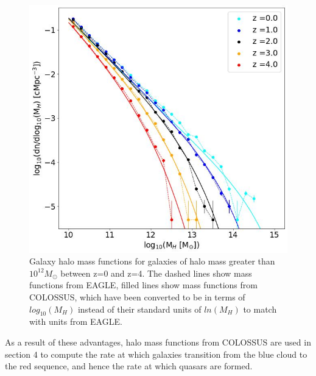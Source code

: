 \documentclass[12pt, twocolumn]{revtex4}    %
\begin{document}
\begin{figure}[H]
\centering
\includegraphics[width=\linewidth]{Mass_Function.jpeg}
\caption{Galaxy halo mass functions for galaxies of halo mass greater than $10^{12}M_\odot$ between z=0 and z=4. The dashed lines show mass functions from EAGLE, filled lines show mass functions from COLOSSUS, which have been converted to be in terms of $log_{10}(M_H)$ instead of their standard units of $ln(M_H)$ to match with units from EAGLE.}
\label{fig:2}
\end{figure}

As a result of these advantages, halo mass functions from COLOSSUS are used in section 4 to compute the rate at which galaxies transition from the blue cloud to the red sequence, and hence the rate at which quasars are formed.
\end{document}

